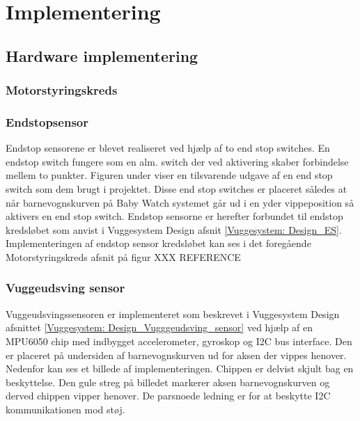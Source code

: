 \section{Implementering}
\label{Vuggesystem: Implementering} 
\subsection{Hardware implementering}

\subsubsection{Motorstyringskreds}
\newpage
\subsubsection{Endstopsensor}\label{Vuggesystem: Implementering_ES} 
Endstop sensorene er blevet realiseret ved hjælp af to end stop switches. En endstop switch fungere som en alm. switch der ved aktivering skaber forbindelse mellem to punkter. Figuren under viser en tilsvarende udgave af en end stop switch som dem brugt i projektet.
 Disse end stop switches er placeret således at når barnevognskurven på Baby Watch systemet går ud i en yder vippeposition så aktivers en end stop switch.
Endstop sensorne er herefter forbundet til endstop kredsløbet som anvist i Vuggesystem Design afsnit \ref{Vuggesystem: Design_ES}. \\
Implementeringen af endstop sensor kredsløbet kan ses i det foregående Motorstyringskreds afsnit på figur XXX REFERENCE
\newpage
\subsubsection{Vuggeudsving sensor}
\label{Vuggesystem: Implementering_VuggeudsvingSensor}
Vuggeudsvingssensoren er implementeret som beskrevet i Vuggesystem Design afsnittet \ref{Vuggesystem: Design_Vugggeudsving_sensor} ved hjælp af en MPU6050 chip med indbygget accelerometer, gyroskop og I2C bus interface. Den er placeret på undersiden af barnevognskurven ud for aksen der vippes henover. Nedenfor kan ses et billede af implementeringen. 
Chippen er delvist skjult bag en beskyttelse. Den gule streg på billedet markerer aksen barnevognskurven og derved chippen vipper henover. 
De parsnoede ledning er for at beskytte I2C kommunikationen mod støj.


